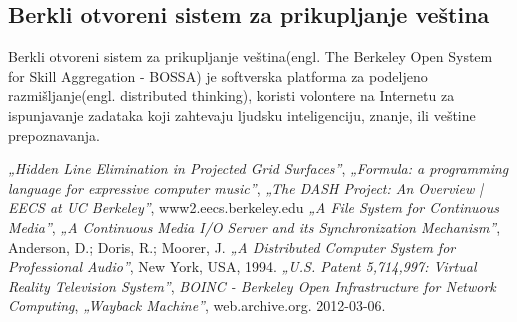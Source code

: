 \documentclass[titlepage, 12pt]{article}
\begin{document}
\subsection{Berkli otvoreni sistem za prikupljanje veština}
Berkli otvoreni sistem za prikupljanje veština(engl. The Berkeley Open System for Skill Aggregation - BOSSA) je softverska platforma za podeljeno razmišljanje(engl. distributed thinking), koristi volontere na Internetu za ispunjavanje zadataka koji zahtevaju ljudsku inteligenciju, znanje, ili veštine prepoznavanja.
\appendix

\newpage
\begin{thebibliography}{9}
  
  \textit{„Hidden Line Elimination in Projected Grid Surfaces”},
    \textit{„Formula: a programming language for expressive computer music”},
    \textit{ „The DASH Project: An Overview | EECS at UC Berkeley”},
    www2.eecs.berkeley.edu
    \textit{ „A File System for Continuous Media”},
    \textit{„A Continuous Media I/O Server and its Synchronization Mechanism”},
    Anderson, D.; Doris, R.; Moorer, J.
    \textit{ „A Distributed Computer System for Professional Audio”},
    New York, USA,
    1994.
    \textit{„U.S. Patent 5,714,997: Virtual Reality Television System”},
    \textit{BOINC - Berkeley Open Infrastructure for Network Computing},
    \textit{ „Wayback Machine”},
    web.archive.org. 2012-03-06. 
\end{thebibliography}
\end{document}
